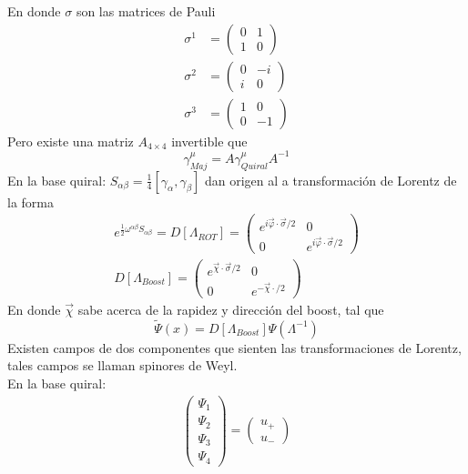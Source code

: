 \documentclass[../main.tex]{subfiles}
\begin{document}
En donde $\sigma $ son las matrices de Pauli
\begin{align*}
  \sigma^1 & = \begin{pmatrix}
    0 & 1 \\ 1 & 0 
  \end{pmatrix}
  \\
  \sigma^2 & = \begin{pmatrix}
    0 & -i \\ i & 0
  \end{pmatrix} \\
  \sigma^3 & = \begin{pmatrix}
    1 & 0 \\ 0 & -1
  \end{pmatrix}
\end{align*} 
Pero existe una matriz $A_{4\times 4}$ invertible que
\begin{equation*}
  \gamma^\mu_{Maj} = A \gamma^\mu_{Quiral} A^{-1}
\end{equation*}
En la base quiral: $S_{\alpha \beta} = \frac{1}{4}[\gamma_\alpha , \gamma_\beta]$ dan origen al a transformación de Lorentz de la forma 
\begin{align*}
  e^{\frac{1}{2}\omega^{\alpha \beta}S_{\alpha \beta}} = D[\Lambda_{ROT}] = \begin{pmatrix}
    e^{i\vec{\varphi}\cdot \vec{\sigma}/2} & 0 \\ 0 & e^{i\vec{\varphi}\cdot \vec{\sigma}/2}
  \end{pmatrix}\\
  D[\Lambda_{Boost}] = \begin{pmatrix}
    e^{\vec{\chi}\cdot\vec{\sigma}/2} & 0 \\ 0 & e^{-\vec{\chi}\cdot /2}
  \end{pmatrix}
\end{align*}
En donde $\vec{\chi}$ sabe acerca de la rapidez y dirección del boost, tal que
\begin{equation*}
  \tilde{\Psi}(x) = D[\Lambda_{Boost}] \Psi(\Lambda^{-1})
\end{equation*}
Existen campos de dos componentes que sienten las transformaciones de Lorentz, tales campos se llaman spinores de Weyl. \\
En la base quiral:
\begin{align*}
  \begin{pmatrix}
    \Psi_1 \\ \Psi_2 \\ \Psi_3 \\ \Psi_4
  \end{pmatrix} = \begin{pmatrix}
    u_+ \\ u_-
  \end{pmatrix}
\end{align*}
\end{document}

